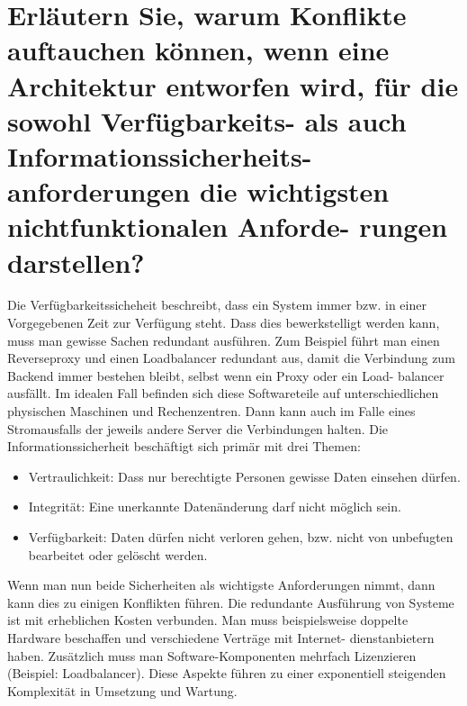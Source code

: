 \documentclass[12pt]{article}
\begin{document}
\section{Erläutern Sie, warum Konflikte auftauchen können, wenn eine Architektur entworfen wird, für die sowohl
Verfügbarkeits- als auch Informationssicherheits- anforderungen die wichtigsten nichtfunktionalen Anforde-
rungen darstellen?}
Die Verfügbarkeitssicheheit beschreibt, dass ein System immer bzw. in einer Vorgegebenen Zeit zur Verfügung steht. Dass dies bewerkstelligt werden kann, muss man gewisse Sachen redundant ausführen. Zum Beispiel führt man einen Reverseproxy und einen Loadbalancer redundant aus, damit die Verbindung zum Backend immer bestehen bleibt, selbst wenn ein Proxy oder ein Load- balancer ausfällt. Im idealen Fall befinden sich diese Softwareteile auf unterschiedlichen physischen Maschinen und Rechenzentren. Dann kann auch im Falle eines Stromausfalls der jeweils andere Server die Verbindungen halten. Die Informationssicherheit beschäftigt sich primär mit drei Themen:
\begin{itemize}
 \item Vertraulichkeit: Dass nur berechtigte Personen gewisse Daten einsehen dürfen.
 \item Integrität: Eine unerkannte Datenänderung darf nicht möglich sein.
 \item Verfügbarkeit: Daten dürfen nicht verloren gehen, bzw. nicht von unbefugten bearbeitet oder gelöscht werden.
\end{itemize}


Wenn man nun beide Sicherheiten als wichtigste Anforderungen nimmt, dann kann dies zu einigen Konflikten führen.
Die redundante Ausführung von Systeme ist mit erheblichen Kosten verbunden. Man muss beispielsweise doppelte Hardware beschaffen und verschiedene Verträge mit Internet- dienstanbietern haben. Zusätzlich muss man Software-Komponenten mehrfach Lizenzieren (Beispiel: Loadbalancer). Diese Aspekte führen zu einer exponentiell steigenden Komplexität in Umsetzung und Wartung.
\cite{info}
\cite{verf}
\end{document}
